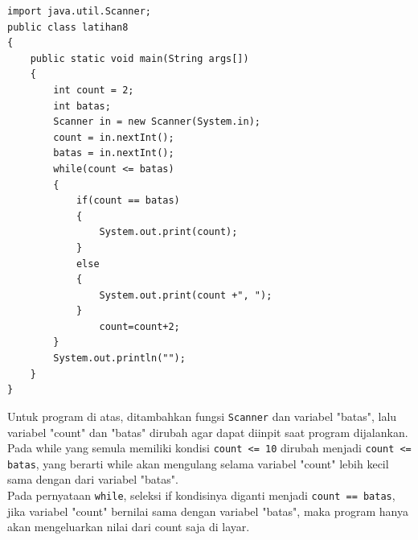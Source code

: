 \documentclass[a4paper,12pt]{article}
\begin{document}
\begin{lstlisting}[frame=single]
import java.util.Scanner;
public class latihan8
{
    public static void main(String args[])
    {
        int count = 2;
        int batas;
        Scanner in = new Scanner(System.in);
        count = in.nextInt();
        batas = in.nextInt();
        while(count <= batas)
        {
	        if(count == batas)
            {
	            System.out.print(count);
            }
            else
	        {
	            System.out.print(count +", ");
            }
                count=count+2;
        }
        System.out.println("");
    }
}
\end{lstlisting}
Untuk program di atas, ditambahkan fungsi \texttt{Scanner} dan variabel "batas", lalu variabel "count" dan "batas" dirubah agar dapat diinpit saat program dijalankan. Pada while yang semula memiliki kondisi \texttt{count <= 10} dirubah menjadi \texttt{count <= batas}, yang berarti while akan mengulang selama variabel "count" lebih kecil sama dengan dari variabel "batas".\\
Pada pernyataan \texttt{while}, seleksi if kondisinya diganti menjadi \texttt{count == batas}, jika variabel "count" bernilai sama dengan variabel "batas", maka program hanya akan mengeluarkan nilai dari count saja di layar.
\end{document}
